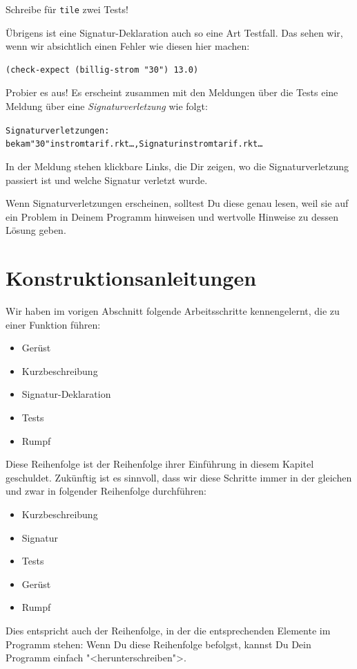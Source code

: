 \begin{aufgabeinline}
  Schreibe für \texttt{tile} zwei Tests!
\end{aufgabeinline}
%
Übrigens ist eine Signatur-Deklaration auch so eine Art Testfall.
Das sehen wir, wenn wir absichtlich einen Fehler wie diesen hier
machen:
%
\begin{verbatim}
(check-expect (billig-strom "30") 13.0)
\end{verbatim}
%
Probier es aus!  Es erscheint zusammen mit den Meldungen über die
Tests eine Meldung über eine
\textit{Signaturverletzung} wie folgt:
%
\begin{alltt}
Signaturverletzungen:
	bekam "30" in stromtarif.rkt \ldots, Signatur in stromtarif.rkt \ldots
\end{alltt}
%
In der Meldung stehen klickbare Links, die Dir zeigen, wo die
Signaturverletzung passiert ist und welche Signatur verletzt wurde.

Wenn Signaturverletzungen erscheinen, solltest Du diese genau lesen,
weil sie auf ein Problem in Deinem Programm hinweisen und wertvolle
Hinweise zu dessen Lösung geben.

\section{Konstruktionsanleitungen}
\label{sec:konstruktionsanleitungen}
%
Wir haben im vorigen Abschnitt folgende Arbeitsschritte kennengelernt,
die zu einer Funktion führen:
%
\begin{itemize}
\item Gerüst
\item Kurzbeschreibung
\item Signatur-Deklaration
\item Tests
\item Rumpf
\end{itemize}
%
Diese Reihenfolge ist der Reihenfolge ihrer Einführung in diesem
Kapitel geschuldet.  Zukünftig ist es sinnvoll, dass wir diese Schritte
immer in der gleichen und zwar in folgender Reihenfolge durchführen:
%
\begin{itemize}
\item Kurzbeschreibung
\item Signatur
\item Tests
\item Gerüst
\item Rumpf
\end{itemize}
%
Dies entspricht auch der Reihenfolge, in der die entsprechenden
Elemente im Programm stehen: Wenn Du diese Reihenfolge befolgst,
kannst Du Dein Programm einfach "<herunterschreiben">.


